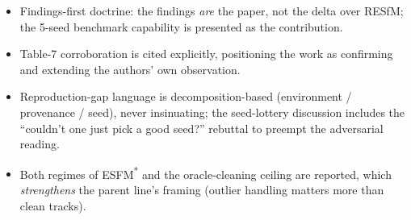 \documentclass[11pt]{article}
\begin{document}
\begin{itemize}[leftmargin=1.6em,itemsep=2pt]
\item Findings-first doctrine: the findings \emph{are} the paper, not the delta over RESfM;
the 5-seed benchmark capability is presented as the contribution.
\item Table-7 corroboration is cited explicitly, positioning the work as confirming and
extending the authors' own observation.
\item Reproduction-gap language is decomposition-based (environment / provenance / seed), never
insinuating; the seed-lottery discussion includes the ``couldn't one just pick a good seed?''
rebuttal to preempt the adversarial reading.
\item Both regimes of ESFM\textsuperscript{*} and the oracle-cleaning ceiling are reported,
which \emph{strengthens} the parent line's framing (outlier handling matters more than clean
tracks).
\end{itemize}
\end{document}
